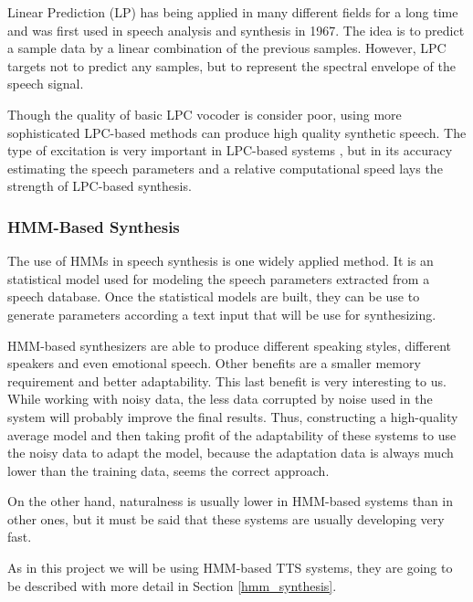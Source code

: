 Linear Prediction (LP) has being applied in many different fields for a long time and was first used in speech analysis and synthesis in 1967. The idea is to predict a sample data by a linear combination of the previous samples. However, LPC targets not to predict any samples, but to represent the spectral envelope of the speech signal. 

Though the quality of basic LPC vocoder is consider poor, using more sophisticated LPC-based methods can produce high quality synthetic speech. The type of excitation is very important in LPC-based systems \cite{TuomoMSc}, but in its accuracy estimating the speech parameters and a relative computational speed lays the strength of LPC-based synthesis.

\subsubsection{HMM-Based Synthesis}
\label{hmm_based_speech_synthesis}
The use of HMMs in speech synthesis is one widely applied method. It is an statistical model used for modeling the speech parameters extracted from a speech database. Once the statistical models are built, they can be use to generate parameters according a text input that will be use for synthesizing. 

HMM-based synthesizers are able to produce different speaking styles, different speakers and even emotional speech. Other benefits are a smaller memory requirement and better adaptability. This last benefit is very interesting to us. While working with noisy data, the less data corrupted by noise used in the system will probably improve the final results. Thus, constructing a high-quality average model and then taking profit of the adaptability of these systems to use the noisy data to adapt the model, because the adaptation data is always much lower than the training data, seems the correct approach.

On the other hand, naturalness is usually lower in HMM-based systems than in other ones, but it must be said that these systems are usually developing very fast. 

As in this project we will be using HMM-based TTS systems, they are going to be described with more detail in Section \ref{hmm_synthesis}.